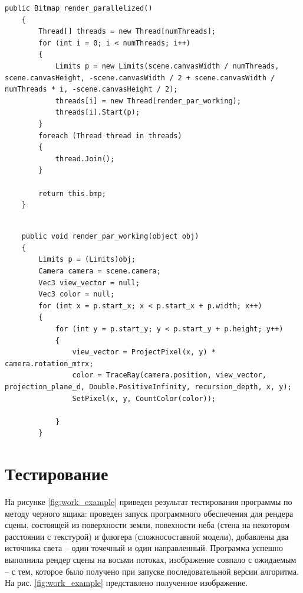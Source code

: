 \begin{lstlisting}[caption=Реализация главного потока параллельного алгоритма трассировки лучей,
	label={tras_main}]
public Bitmap render_parallelized()
	{
		Thread[] threads = new Thread[numThreads];
		for (int i = 0; i < numThreads; i++)
		{
			Limits p = new Limits(scene.canvasWidth / numThreads, scene.canvasHeight, -scene.canvasWidth / 2 + scene.canvasWidth / numThreads * i, -scene.canvasHeight / 2);
			threads[i] = new Thread(render_par_working);
			threads[i].Start(p);
		}
		foreach (Thread thread in threads)
		{
			thread.Join();
		}
		
		return this.bmp;
	}
\end{lstlisting}

\begin{lstlisting}[caption=Реализация рабочего потока параллельного алгоритма трассировки лучей,
	label={tras_work}]

	public void render_par_working(object obj)
	{
		Limits p = (Limits)obj;
		Camera camera = scene.camera;
		Vec3 view_vector = null;
		Vec3 color = null;
		for (int x = p.start_x; x < p.start_x + p.width; x++)
		{
			for (int y = p.start_y; y < p.start_y + p.height; y++)
			{
				view_vector = ProjectPixel(x, y) * camera.rotation_mtrx;
				color = TraceRay(camera.position, view_vector, projection_plane_d, Double.PositiveInfinity, recursion_depth, x, y);
				SetPixel(x, y, CountColor(color));
				
			}
		}
\end{lstlisting}

\section{Тестирование}

На рисунке \ref{fig:work_example} приведен результат тестирования программы по методу черного ящика: проведен запуск программного обеспечения для рендера сцены, состоящей из поверхности земли, повехности неба (стена на некотором расстоянии с текстурой) и флюгера (сложносоставной модели), добавлены два источника света -- один точечный и один направленный. Программа успешно выполнила рендер сцены на восьми потоках, изображение совпало с ожидаемым -- с тем, которое было получено при запуске последовательной версии алгоритма. На рис. \ref{fig:work_example} представлено полученное изображение.

